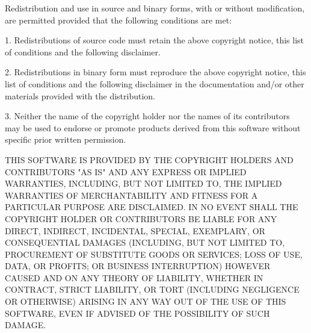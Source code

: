 \begin{DoxyCode}
Redistribution and use in source and binary forms, with or without modification, are permitted provided
       that the following conditions are met:

1. Redistributions of source code must retain the above copyright notice, this list of conditions and the
       following disclaimer.

2. Redistributions in binary form must reproduce the above copyright notice, this list of conditions and
       the following disclaimer in the documentation and/or other materials provided with the distribution.

3. Neither the name of the copyright holder nor the names of its contributors may be used to endorse or
       promote products derived from this software without specific prior written permission.

THIS SOFTWARE IS PROVIDED BY THE COPYRIGHT HOLDERS AND CONTRIBUTORS "AS IS" AND ANY EXPRESS OR IMPLIED
       WARRANTIES, INCLUDING, BUT NOT LIMITED TO, THE IMPLIED WARRANTIES OF MERCHANTABILITY AND FITNESS FOR A
       PARTICULAR PURPOSE ARE DISCLAIMED. IN NO EVENT SHALL THE COPYRIGHT HOLDER OR CONTRIBUTORS BE LIABLE FOR ANY DIRECT,
       INDIRECT, INCIDENTAL, SPECIAL, EXEMPLARY, OR CONSEQUENTIAL DAMAGES (INCLUDING, BUT NOT LIMITED TO,
       PROCUREMENT OF SUBSTITUTE GOODS OR SERVICES; LOSS OF USE, DATA, OR PROFITS; OR BUSINESS INTERRUPTION) HOWEVER CAUSED
       AND ON ANY THEORY OF LIABILITY, WHETHER IN CONTRACT, STRICT LIABILITY, OR TORT (INCLUDING NEGLIGENCE OR
       OTHERWISE) ARISING IN ANY WAY OUT OF THE USE OF THIS SOFTWARE, EVEN IF ADVISED OF THE POSSIBILITY OF SUCH DAMAGE.
\end{DoxyCode}
 